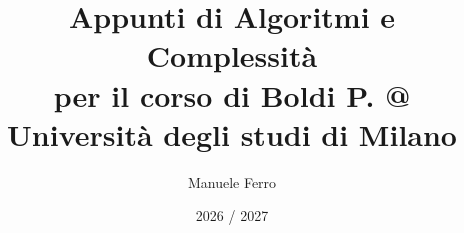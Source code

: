 \title{\Huge Appunti di Algoritmi e Complessità\\\small per il corso di Boldi P.  @ Università degli studi di Milano}
\author{Manuele Ferro}
\date{2026 / 2027}
